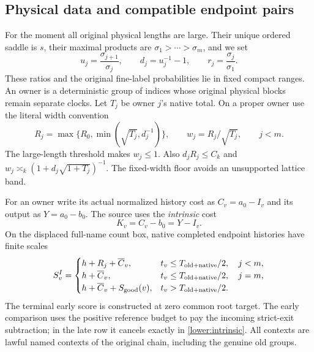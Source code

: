 \subsection{Physical data and compatible endpoint pairs}
\label{lower:data}
For the moment all original physical lengths are large.  Their unique
ordered saddle is $s$, their maximal products are
$\sigma_1>\cdots>\sigma_m$, and we set
\[
 u_j=\frac{\sigma_{j+1}}{\sigma_j},\qquad
 d_j=u_j^{-1}-1,\qquad r_j=\frac{\sigma_j}{\sigma_1}.
\]
These ratios and the original fine-label probabilities lie in fixed
compact ranges.  An owner is a deterministic group of indices whose
original physical blocks remain separate clocks.  Let $T_j$ be owner $j$'s
native total.  On a proper owner use the literal width convention
\begin{equation}
 R_j=\max\{R_0,\min(\sqrt{T_j},d_j^{-1})\},\qquad
 w_j=R_j/\sqrt{T_j},\qquad j<m.
 \label{lower:width}
\end{equation}
The large-length threshold makes $w_j\leq1$.  Also
$d_jR_j\leq C_k$ and
$w_j\asymp_k(1+d_j\sqrt{1+T_j})^{-1}$.
The fixed-width floor avoids an unsupported lattice band.

For an owner write its actual normalized history cost as
$C_v=a_0-I_v$ and its output as $Y=a_0-b_0$.  The source uses the
\emph{intrinsic} cost
\begin{equation}
 K_v=C_v-b_0=Y-I_v.
 \label{lower:intrinsic}
\end{equation}
On the displaced full-name count box, native completed endpoint
histories have finite scales
\begin{equation}
 S_v^I=\begin{cases}
 h+R_j+\overline C_v,&t_v\leq T_{\rm old+native}/2,\quad j<m,\\
 h+\overline C_v,&t_v\leq T_{\rm old+native}/2,\quad j=m,\\
 h+\overline C_v+S_{\rm good}(v),&t_v>T_{\rm old+native}/2.
 \end{cases}
 \label{lower:intrinsic-scores}
\end{equation}
The terminal early score is constructed at zero common root target.
The early comparison uses the positive reference budget to pay the
incoming strict-exit subtraction; in the late row it cancels exactly in
\eqref{lower:intrinsic}.  All contexts are lawful named contexts of
the original chain, including the genuine old groups.


